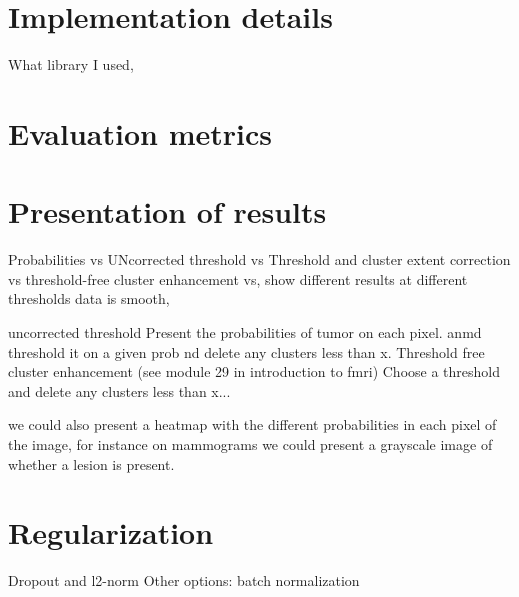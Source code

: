 \section{Implementation details}
What library I used,

\section{Evaluation metrics}

\section{Presentation of results}
Probabilities vs UNcorrected threshold vs Threshold and cluster extent correction vs threshold-free cluster enhancement vs, show different results at different thresholds
data is smooth, 

uncorrected threshold
Present the probabilities of tumor on each pixel. anmd threshold it on a given prob nd delete any clusters less than x.
Threshold free cluster enhancement (see module 29 in introduction to fmri)
Choose a threshold and delete any clusters less than x...

we could also present a heatmap with the different probabilities in each pixel of the image, for instance on mammograms we could present a grayscale image of whether a lesion is present.




\section{Regularization}
Dropout and l2-norm
Other options: batch normalization

